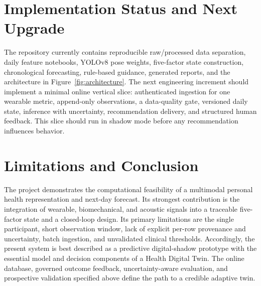 \documentclass[11pt,a4paper]{article}
\begin{document}
\section{Implementation Status and Next Upgrade}
The repository currently contains reproducible raw/processed data separation, daily feature notebooks, YOLOv8 pose weights, five-factor state construction, chronological forecasting, rule-based guidance, generated reports, and the architecture in Figure~\ref{fig:architecture}. The next engineering increment should implement a minimal online vertical slice: authenticated ingestion for one wearable metric, append-only observations, a data-quality gate, versioned daily state, inference with uncertainty, recommendation delivery, and structured human feedback. This slice should run in shadow mode before any recommendation influences behavior.

\section{Limitations and Conclusion}
The project demonstrates the computational feasibility of a multimodal personal health representation and next-day forecast. Its strongest contribution is the integration of wearable, biomechanical, and acoustic signals into a traceable five-factor state and a closed-loop design. Its primary limitations are the single participant, short observation window, lack of explicit per-row provenance and uncertainty, batch ingestion, and unvalidated clinical thresholds. Accordingly, the present system is best described as a predictive digital-shadow prototype with the essential model and decision components of a Health Digital Twin. The online database, governed outcome feedback, uncertainty-aware evaluation, and prospective validation specified above define the path to a credible adaptive twin.
\end{document}
